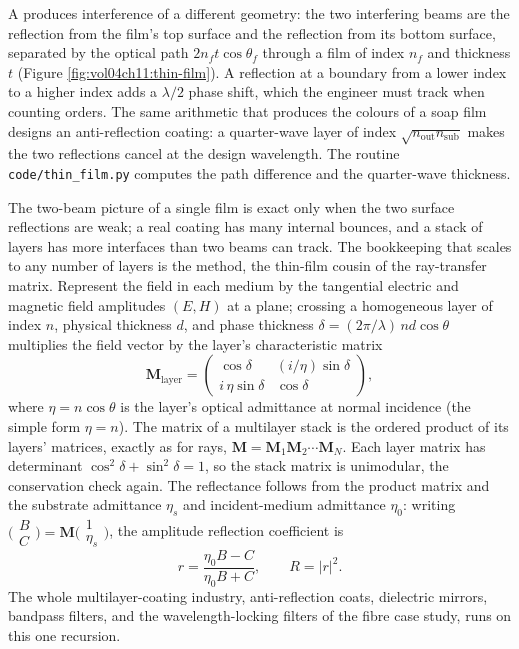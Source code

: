 A  produces interference of a different geometry:
the two interfering beams are the reflection from the film's top surface
and the reflection from its bottom surface, separated by the optical
path $2 n_{f} t\cos\theta_{f}$ through a film of index $n_{f}$ and
thickness $t$ (Figure \ref{fig:vol04ch11:thin-film}). A reflection at a
boundary from a lower index to a higher index adds a $\lambda/2$ phase
shift, which the engineer must track when counting orders. The same
arithmetic that produces the colours of a soap film designs an
anti-reflection coating: a quarter-wave layer of index
$\sqrt{n_{\text{out}} n_{\text{sub}}}$ makes the two reflections cancel
at the design wavelength. The routine \texttt{code/thin\_film.py}
computes the path difference and the quarter-wave thickness.



The two-beam picture of a single film is exact only when the two surface
reflections are weak; a real coating has many internal bounces, and a stack of
layers has more interfaces than two beams can track. The bookkeeping that scales
to any number of layers is the  method, the
thin-film cousin of the ray-transfer matrix. Represent the field in each medium
by the tangential electric and magnetic field amplitudes $(E, H)$ at a plane;
crossing a homogeneous layer of index $n$, physical thickness $d$, and
phase thickness $\delta = (2\pi/\lambda)\,n d\cos\theta$ multiplies the field
vector by the layer's characteristic matrix
\[
\mathbf{M}_{\text{layer}}
= \begin{pmatrix} \cos\delta & (i/\eta)\sin\delta \\
i\,\eta\sin\delta & \cos\delta \end{pmatrix},
\]
where $\eta = n\cos\theta$ is the layer's optical admittance at normal incidence
(the simple form $\eta = n$). The matrix of a multilayer stack is the ordered
product of its layers' matrices, exactly as for rays,
$\mathbf{M} = \mathbf{M}_1 \mathbf{M}_2 \cdots \mathbf{M}_N$. Each layer matrix
has determinant $\cos^2\delta + \sin^2\delta = 1$, so the stack matrix is
unimodular, the conservation check again. The reflectance follows from the
product matrix and the substrate admittance $\eta_s$ and incident-medium
admittance $\eta_0$: writing
$\big(\begin{smallmatrix} B \\ C\end{smallmatrix}\big) = \mathbf{M}
\big(\begin{smallmatrix} 1 \\ \eta_s\end{smallmatrix}\big)$, the amplitude
reflection coefficient is
\[
r = \frac{\eta_0 B - C}{\eta_0 B + C},
\qquad R = |r|^2 .
\]
The whole multilayer-coating industry, anti-reflection coats, dielectric mirrors,
bandpass filters, and the wavelength-locking filters of the fibre case study,
runs on this one recursion.

